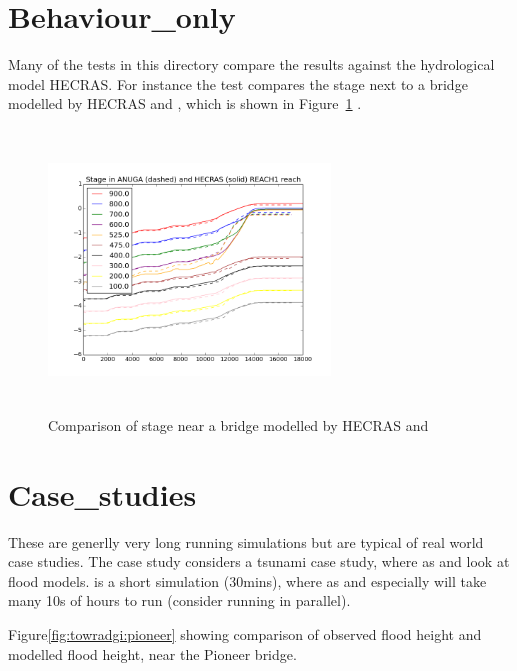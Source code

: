 \documentclass{manual}
\begin{document}
\section{Behaviour\_only}

Many of the tests in this directory compare the \anuga results against the hydrological model HECRAS. For instance the test  compares the stage next to a bridge modelled by HECRAS and \anuga, which is shown in Figure~\ref{fig:hecras:anuga} .

\begin{figure}[htp]
  \centerline{\includegraphics[width=75mm, height=75mm]
    {graphics/CENTRAL-CHANNEL.png}}
  \caption{Comparison of stage near a  bridge modelled by HECRAS and \anuga}
  \label{fig:hecras:anuga}
\end{figure}


\section{Case\_studies}

These are generlly very long running simulations but are typical of real world case studies. The case study  considers a tsunami case study, where as  and  look at flood models.   is a short  simulation (30mins), 
where as  and especially  will take many 10s of hours to run (consider running in parallel). 

Figure\ref{fig:towradgi:pioneer} showing comparison of observed flood height and \anuga modelled flood height, near the Pioneer bridge. 
\end{document}
